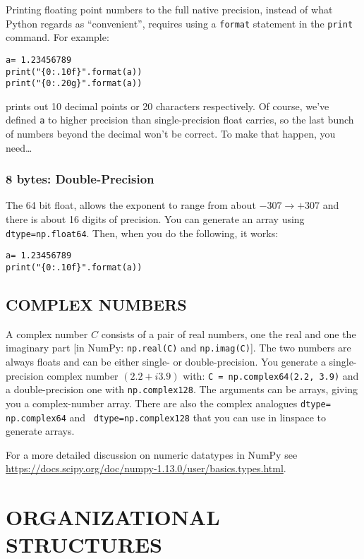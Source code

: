 \documentclass[psfig,preprint]{aastex}
\begin{document}
	Printing floating point numbers to the full native precision,
instead of what Python regards as ``convenient'', requires using a 
\verb$format$ statement in the \verb$print$ command. For example:

\begin{verbatim}
a= 1.23456789
print("{0:.10f}".format(a))
print("{0:.20g}".format(a))
\end{verbatim}

\noindent prints out 10 decimal points or 20 characters respectively.  
Of course, we've defined \verb$a$ to higher precision
than single-precision float carries, so the last bunch of numbers beyond
the decimal won't be correct. To make that happen, you need\dots

\subsubsection{8 bytes: Double-Precision}

	The 64 bit float, allows the exponent to range from about $-307
\rightarrow +307$ and there is about 16 digits of precision.  You can 
generate an array using {\tt dtype=np.float64}. Then, when you do the
following, it works:

\begin{verbatim}
a= 1.23456789
print("{0:.10f}".format(a))
\end{verbatim}

\subsection{COMPLEX NUMBERS}

A complex number $C$ consists of a pair of real numbers, one the real and
one the imaginary part [in NumPy: {\tt np.real(C)} and {\tt np.imag(C)}].
The two numbers are always floats and can be either single- or
double-precision. You generate a single-precision complex number $(2.2 +
i3.9)$ with: {\tt C = np.complex64(2.2, 3.9)} and a double-precision one with
{\tt np.complex128}. The arguments can be arrays, giving you a complex-number
array. There are also the complex analogues {\tt dtype= np.complex64} and {\tt
  dtype=np.complex128} that you can use in linspace to generate arrays.

For a more detailed discussion on numeric datatypes in NumPy see \url{https://docs.scipy.org/doc/numpy-1.13.0/user/basics.types.html}.

\section{ORGANIZATIONAL STRUCTURES}
\end{document}
